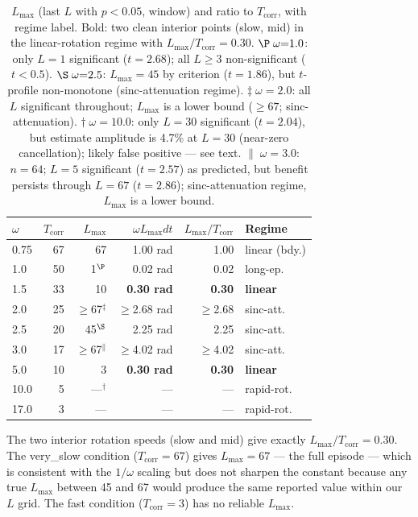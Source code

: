 \documentclass[sigconf,anonymous]{aamas}
\newcommand{\Lmax}{L_{\max}}
\newcommand{\Tcorr}{T_{\mathrm{corr}}}
\begin{document}
\begin{table}[b]
\centering
\caption{$\Lmax$ (last $L$ with $p{<}0.05$, window) and
         ratio to $\Tcorr$, with regime label.
         Bold: two clean interior points (slow, mid)
         in the linear-rotation regime with $\Lmax/\Tcorr = 0.30$.
         $\P\;\omega{=}1.0$: only $L{=}1$ significant ($t{=}2.68$);
         all $L{\geq}3$ non-significant ($t{<}0.5$).
         $\S\;\omega{=}2.5$: $\Lmax{=}45$ by criterion ($t{=}1.86$),
         but $t$-profile non-monotone (sinc-attenuation regime).
         $\ddagger\;\omega{=}2.0$: all $L$ significant throughout;
         $\Lmax$ is a lower bound (${\geq}67$; sinc-attenuation).
         $\dagger\;\omega{=}10.0$: only $L{=}30$ significant ($t{=}2.04$),
         but estimate amplitude is 4.7\% at $L{=}30$ (near-zero
         cancellation); likely false positive — see text.
         $\|\;\omega{=}3.0$: $n{=}64$; $L{=}5$ significant ($t{=}2.57$) as
         predicted, but benefit persists through $L{=}67$ ($t{=}2.86$);
         sinc-attenuation regime, $\Lmax$ is a lower bound.}
\label{tab:lmax}
\setlength\tabcolsep{4pt}
\begin{tabular}{lrrrrl}
\toprule
$\omega$ & $\Tcorr$ & $\Lmax$ & $\omega\Lmax dt$ & $\Lmax/\Tcorr$ & Regime \\
\midrule
0.75 & 67 & 67            & 1.00 rad          & 1.00 & linear (bdy.) \\
1.0  & 50 & 1$^{\P}$     & 0.02 rad          & 0.02 & long-ep. \\
1.5  & 33 & 10            & \textbf{0.30 rad} & \textbf{0.30} & \textbf{linear} \\
2.0  & 25 & ${\geq}$67$^{\ddagger}$ & ${\geq}$2.68 rad & ${\geq}$2.68 & sinc-att. \\
2.5  & 20 & 45$^{\S}$    & 2.25 rad          & 2.25 & sinc-att. \\
3.0  & 17 & ${\geq}$67$^{\|}$ & ${\geq}$4.02 rad & ${\geq}$4.02 & sinc-att. \\
5.0  & 10 &  3            & \textbf{0.30 rad} & \textbf{0.30} & \textbf{linear} \\
10.0 &  5 & ---$^{\dagger}$ & ---            & ---  & rapid-rot. \\
17.0 &  3 & ---           & ---               & --- & rapid-rot. \\
\bottomrule
\end{tabular}
\end{table}

\noindent
The two interior rotation speeds (slow and mid) give exactly
$\Lmax/\Tcorr = 0.30$.  The very\_slow condition ($\Tcorr{=}67$)
gives $\Lmax{=}67$ — the full episode — which is consistent with
the $1/\omega$ scaling but does not sharpen the constant because any
true $\Lmax$ between 45 and 67 would produce the same reported
value within our $L$ grid.  The fast condition ($\Tcorr{=}3$)
has no reliable $\Lmax$.
\end{document}
